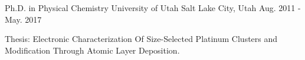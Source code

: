 


\begin{cventries}


\cventry
{Ph.D. in Physical Chemistry}
{University of Utah}
{Salt Lake City, Utah}
{Aug. 2011 - May. 2017}
{
\begin{cvitems}
\item {Thesis: Electronic Characterization Of Size-Selected Platinum Clusters
    and Modification Through Atomic Layer Deposition.}
\end{cvitems}
}


\end{cventries}
